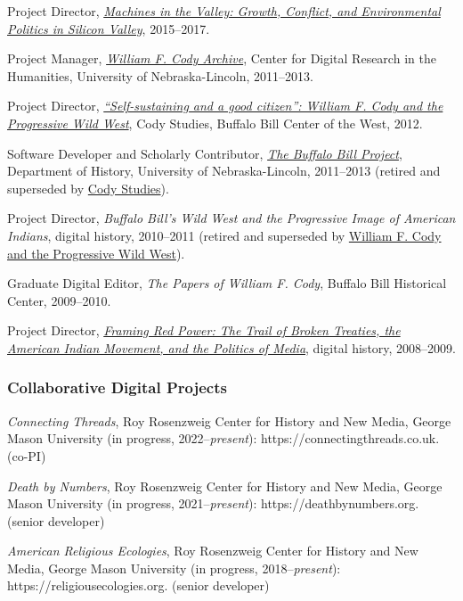 Project Director,
\emph{\href{http://dissertation.jasonheppler.org}{Machines in the
Valley: Growth, Conflict, and Environmental Politics in Silicon
Valley}}, 2015--2017.

Project Manager, \emph{\href{http://codyarchive.org/}{William F. Cody
Archive}}, Center for Digital Research in the Humanities, University of
Nebraska-Lincoln, 2011--2013.

Project Director,
\emph{\href{http://www.codystudies.org/showindians/}{``Self-sustaining
and a good citizen'': William F. Cody and the Progressive Wild West}},
Cody Studies, Buffalo Bill Center of the West, 2012.

Software Developer and Scholarly Contributor,
\emph{\href{http://buffalobillproject.unl.edu/}{The Buffalo Bill
Project}}, Department of History, University of Nebraska-Lincoln,
2011--2013 (retired and superseded by
\href{http://www.codystudies.org/}{Cody Studies}).

Project Director, \emph{Buffalo Bill's Wild West and the Progressive
Image of American Indians}, digital history, 2010--2011 (retired and
superseded by \href{http://www.codystudies.org/showindians/}{William F.
Cody and the Progressive Wild West}).

Graduate Digital Editor, \emph{The Papers of William F. Cody}, Buffalo
Bill Historical Center, 2009--2010.

Project Director, \emph{\href{http://framingredpower.org}{Framing Red
Power: The Trail of Broken Treaties, the American Indian Movement, and
the Politics of Media}}, digital history, 2008--2009.

\subsubsection{Collaborative Digital
Projects}\label{collaborative-digital-projects}

\emph{Connecting Threads}, Roy Rosenzweig Center for History and New
Media, George Mason University (in progress, 2022--\emph{present}):
https://connectingthreads.co.uk. (co-PI)

\emph{Death by Numbers}, Roy Rosenzweig Center for History and New
Media, George Mason University (in progress, 2021--\emph{present}):
https://deathbynumbers.org. (senior developer)

\emph{American Religious Ecologies}, Roy Rosenzweig Center for History
and New Media, George Mason University (in progress,
2018--\emph{present}): https://religiousecologies.org. (senior
developer)

